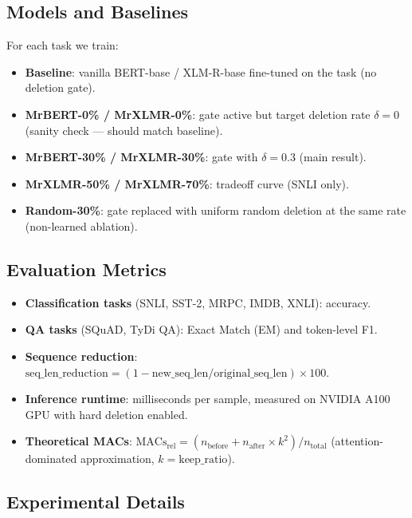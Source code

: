 \documentclass[11pt,a4paper]{article}
\begin{document}
\subsection{Models and Baselines}
\label{sec:models}

For each task we train:
\begin{itemize}[nosep]
    \item \textbf{Baseline}: vanilla BERT-base / XLM-R-base fine-tuned on the task (no deletion gate).
    \item \textbf{MrBERT-0\% / MrXLMR-0\%}: gate active but target deletion rate $\delta = 0$ (sanity check --- should match baseline).
    \item \textbf{MrBERT-30\% / MrXLMR-30\%}: gate with $\delta = 0.3$ (main result).
    \item \textbf{MrXLMR-50\% / MrXLMR-70\%}: tradeoff curve (SNLI only).
    \item \textbf{Random-30\%}: gate replaced with uniform random deletion at the same rate (non-learned ablation).
\end{itemize}


\subsection{Evaluation Metrics}
\label{sec:metrics}

\begin{itemize}[nosep]
    \item \textbf{Classification tasks} (SNLI, SST-2, MRPC, IMDB, XNLI): accuracy.
    \item \textbf{QA tasks} (SQuAD, TyDi QA): Exact Match (EM) and token-level F1.
    \item \textbf{Sequence reduction}: $\text{seq\_len\_reduction} = (1 - \text{new\_seq\_len} / \text{original\_seq\_len}) \times 100$.
    \item \textbf{Inference runtime}: milliseconds per sample, measured on NVIDIA A100 GPU with hard deletion enabled.
    \item \textbf{Theoretical MACs}: $\text{MACs}_{\text{rel}} = (n_{\text{before}} + n_{\text{after}} \times k^2) / n_{\text{total}}$ (attention-dominated approximation, $k = \text{keep\_ratio}$).
\end{itemize}


\subsection{Experimental Details}
\label{sec:exp-details}
\end{document}

